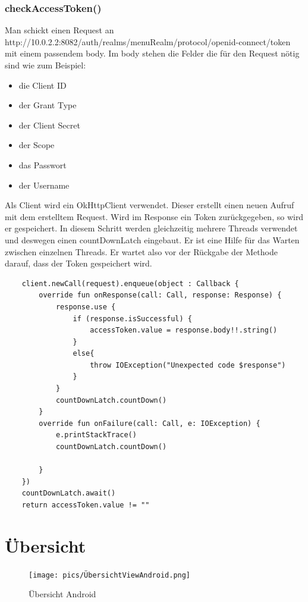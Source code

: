 \subsubsection{checkAccessToken()}

Man schickt einen Request an http://10.0.2.2:8082/auth/realms/menuRealm/protocol/openid-connect/token mit einem passendem body.
Im body stehen die Felder die für den Request nötig sind wie zum Beispiel:
\begin{itemize}
    \item die Client ID
    \item der Grant Type 
    \item der Client Secret
    \item der Scope
    \item das Passwort
    \item der Username
\end{itemize}

Als Client wird ein OkHttpClient verwendet. Dieser erstellt einen neuen Aufruf mit dem erstelltem Request. 
Wird im Response ein Token zurückgegeben, so wird er gespeichert. In diesem Schritt werden gleichzeitig mehrere Threads verwendet und deswegen
einen countDownLatch eingebaut. Er ist eine Hilfe für das Warten zwischen einzelnen Threads.
Er wartet also vor der Rückgabe der Methode darauf, dass der Token gespeichert wird. 


\begin{lstlisting}
    client.newCall(request).enqueue(object : Callback {
        override fun onResponse(call: Call, response: Response) {
            response.use {
                if (response.isSuccessful) {
                    accessToken.value = response.body!!.string()
                }
                else{
                    throw IOException("Unexpected code $response")
                }
            }
            countDownLatch.countDown()
        }
        override fun onFailure(call: Call, e: IOException) {
            e.printStackTrace()
            countDownLatch.countDown()

        }
    })
    countDownLatch.await()
    return accessToken.value != ""
\end{lstlisting}


\pagebreak
\section{Übersicht}
\begin{figure}[htp]
    \centering
    \author{Bozidar Spasenovic}
    \texttt{[image: pics/ÜbersichtViewAndroid.png]}
    \caption{Übersicht Android}
    \label{fig:impl:ÜbersichtViewAndroid}
\end{figure}

